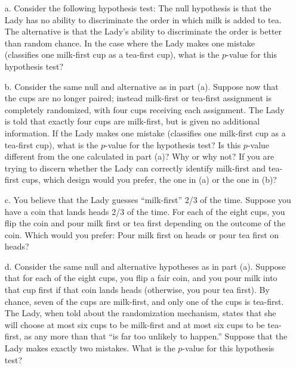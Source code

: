 \documentclass{article}
\begin{document}
\begin{itemize}


\item[a.]   Consider the following hypothesis test:  The null hypothesis 
  is that the Lady has no ability to
  discriminate the order in which milk is added to tea. 
  The alternative is that the Lady's ability to discriminate 
  the order is better than random chance.
  In the case where the Lady makes one mistake (classifies
  one milk-first cup as a tea-first cup), what is the $p$-value for this hypothesis test?

\item[b.] Consider the same null and alternative as in part (a).
  Suppose now that the cups are no longer paired; instead milk-first
  or tea-first assignment is completely randomized, with four cups
  receiving each assignment.  The Lady is told that exactly four cups
  are milk-first, but is given no additional information.  If the Lady
  makes one mistake (classifies one milk-first cup as a tea-first
  cup), what is the $p$-value for the hypothesis test?  Is this
  $p$-value different from the one calculated in part (a)?  Why or why
  not?  If you are trying to discern whether the Lady can correctly
  identify milk-first and tea-first cups, which design would you
  prefer, the one in (a) or the one in (b)?

\item[c.]  You believe that the Lady guesses ``milk-first'' 2/3 of the time.  
  Suppose you have a coin that
  lands heads 2/3 of the time.  
  For each of the eight cups, you flip the coin and pour
  milk first or tea first depending on the outcome of the coin.
  Which would you prefer:  
  Pour milk first on heads or pour tea first on heads?
  
\item[d.]  
  Consider the same null and alternative hypotheses as in part (a).
  Suppose that for each of the eight cups, you flip a fair coin, 
  and you pour milk into that cup first
  if that coin lands heads (otherwise, you pour tea first).
  By chance, seven of the cups are milk-first, and only one of the cups is tea-first.
  The Lady, when told about the randomization mechanism, 
  states that she will choose at most six cups to be milk-first and at most six cups to 
  be tea-first, as any more than that ``is far too unlikely to happen.''
  Suppose that the Lady makes exactly two mistakes.
  What is the $p$-value for this hypothesis test?

\end{itemize}
\end{document}
